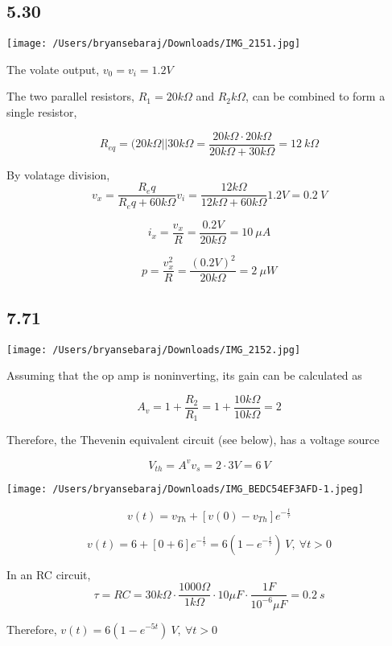 \documentclass{article}
\begin{document}
\subsection*{5.30}

\texttt{[image: /Users/bryansebaraj/Downloads/IMG\_2151.jpg]}

The volate output, $v_0=v_i=1.2 V$

The two parallel resistors, $R_1=20 k\Omega$ and $R_2 k\Omega$, can be combined to form a single resistor, 

$$R_{eq}=(20 k\Omega || 30 k\Omega = \frac{20 k\Omega \cdot 20 k\Omega}{20 k\Omega + 30 k\Omega}=12 \ k\Omega$$

By volatage division, 
$$v_x=\frac{R_eq}{R_eq + 60 k\Omega}v_i=\frac{12 k\Omega}{12 k\Omega + 60 k\Omega}1.2 V=0.2 \ V$$

$$i_x=\frac{v_x}{R}=\frac{0.2 V}{20 k\Omega}=10 \ \mu A$$

$$p=\frac{v_x^2}{R}=\frac{(0.2 V)^2}{20 k\Omega}= 2 \ \mu W$$



\subsection*{7.71}

\texttt{[image: /Users/bryansebaraj/Downloads/IMG\_2152.jpg]}

Assuming that the op amp is noninverting, its gain can be calculated as

$$A_v=1 + \frac{R_2}{R_1}=1+\frac{10 k\Omega}{10 k\Omega}=2$$

Therefore, the Thevenin equivalent circuit (see below), has a voltage source

$$V_{th}=A^v v_s = 2 \cdot 3 V = 6 \ V$$

\texttt{[image: /Users/bryansebaraj/Downloads/IMG\_BEDC54EF3AFD-1.jpeg]}

$$v(t)=v_{Th}+[v(0)-v_{Th}]e^{-\frac{t}{\tau}}$$

$$v(t)=6 + [0 + 6]e^{-\frac{t}{\tau}}=6(1-e^{-\frac{t}{\tau}}) \ V, \  \forall t > 0$$

In an RC circuit, 
$$\tau = RC=30 k\Omega \cdot \frac{1000 \Omega}{1 k\Omega} \cdot 10 \mu F \cdot \frac{1 F}{10^{-6}\mu F}=0.2 \ s$$

Therefore, $v(t)=6(1-e^{-5t}) \ V, \  \forall t > 0$
\end{document}
